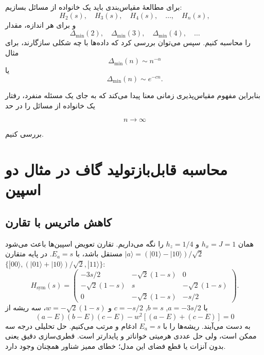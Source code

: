 برای مطالعهٔ مقیاس‌بندی باید یک خانواده از مسائل بسازیم:
\begin{equation}
	H_2(s),\quad
	H_3(s),\quad
	H_4(s),\quad\ldots,\quad H_n(s),
\end{equation}
و برای هر اندازه، مقدار
\begin{equation}
	\Delta_{\min}(2),\quad
	\Delta_{\min}(3),\quad
	\Delta_{\min}(4),\quad\ldots
\end{equation}
را محاسبه کنیم. سپس می‌توان بررسی کرد که داده‌ها با چه شکلی
سازگارند، برای مثال
\begin{equation}
	\Delta_{\min}(n)\sim n^{-\alpha}
\end{equation}
یا
\begin{equation}
	\Delta_{\min}(n)\sim e^{-cn}.
\end{equation}

بنابراین مفهوم مقیاس‌پذیری زمانی معنا پیدا می‌کند که به جای یک مسئله منفرد، رفتار یک خانواده از مسائل را در حد

$$
n\rightarrow\infty
$$

بررسی کنیم.


\section{محاسبه قابل‌بازتولید گاف در مثال دو اسپین}
\label{sec:gap-numerical}
\subsection{کاهش ماتریس با تقارن}
همان $h_x=J=1$ و $h_z=1/4$ را نگه می‌داریم. تقارن تعویض اسپین‌ها باعث می‌شود
$|a\rangle=(|01\rangle-|10\rangle)/\sqrt2$ مستقل باشد، با $E_a=s$.
در پایه متقارن $\{|00\rangle,(|01\rangle+|10\rangle)/\sqrt2,|11\rangle\}$:
\begin{equation}
	H_{\mathrm{sym}}(s)=
	\begin{pmatrix}
		-3s/2&-\sqrt2(1-s)&0\\
		-\sqrt2(1-s)&s&-\sqrt2(1-s)\\
		0&-\sqrt2(1-s)&-s/2
	\end{pmatrix}.
	\label{eq:gap-symmetric-matrix}
\end{equation}
با $a=-3s/2$, $b=s$, $c=-s/2$ و $w=-\sqrt2(1-s)$، سه ریشه از
\begin{equation}
	(a-E)(b-E)(c-E)-w^2[(a-E)+(c-E)]=0
\end{equation}
به دست می‌آیند. ریشه‌ها را با $E_a=s$ ادغام و مرتب می‌کنیم. حل تحلیلی درجه سه ممکن است، ولی حل عددی هرمیتی خواناتر و پایدارتر است. قطری‌سازی دقیق یعنی بدون آنزات یا قطع فضای این مدل؛ خطای ممیز شناور همچنان وجود دارد.

